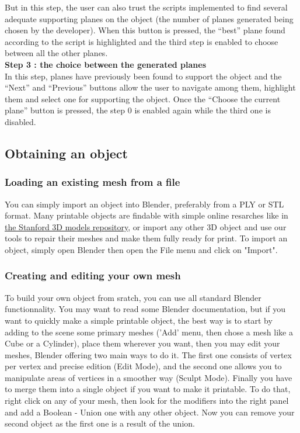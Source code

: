 \documentclass{article}
\begin{document}
But in this step, the user can also trust the scripts implemented to find several adequate supporting planes on the object (the number of planes generated being chosen by the developer). When this button is pressed, the ``best'' plane found according to the script is highlighted and the third step is enabled to choose between all the other planes.\\

\textbf{Step 3 : the choice between the generated planes}\\ 

In this step, planes have previously been found to support the object and the ``Next'' and ``Previous'' buttons allow the user to navigate among them, highlight them and select one for supporting the object. Once the ``Choose the current plane'' button is pressed, the step 0 is enabled again while the third one is disabled. 

\subsection{Obtaining an object}

\subsubsection{Loading an existing mesh from a file}

You can simply import an object into Blender, preferably from a PLY or STL format. Many printable objects are findable with simple online resarches like in \href{http://graphics.stanford.edu/data/3Dscanrep/}{the Stanford 3D models repository}, or import any other 3D object and use our tools to repair their meshes and make them fully ready for print.
To import an object, simply open Blender then open the File menu and click on "Import".

\subsubsection{Creating and editing your own mesh}

To build your own object from sratch, you can use all standard Blender functionnality. You may want to read some Blender documentation, but if you want to quickly make a simple printable object, the best way is to start by adding to the scene some primary meshes ('Add' menu, then chose a mesh like a Cube or a Cylinder), place them wherever you want, then you may edit your meshes, Blender offering two main ways to do it. The first one consists of vertex per vertex and precise edition (Edit Mode), and the second one allows you to manipulate areas of vertices in a smoother way (Sculpt Mode). Finally you have to merge them into a single object if you want to make it printable. To do that, right click on any of your mesh, then look for the modifiers into the right panel and add a Boolean - Union one with any other object. Now you can remove your second object as the first one is a result of the union.
\end{document}
